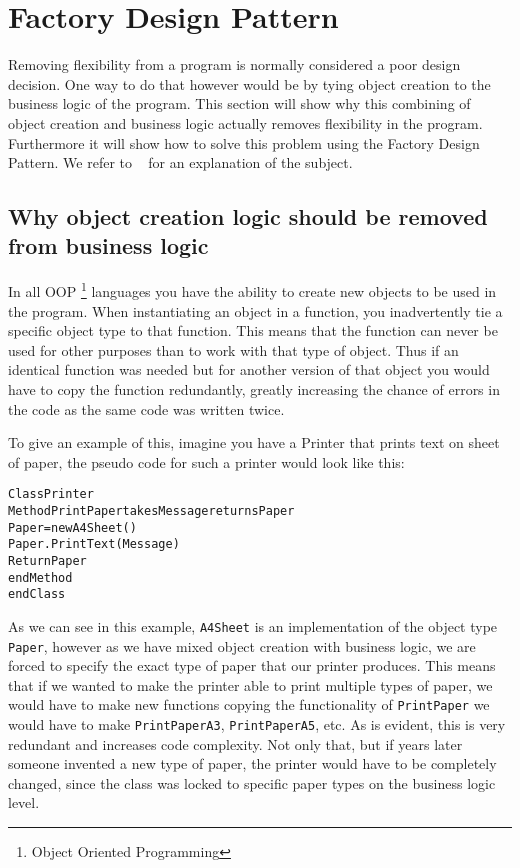 
\section{Factory Design Pattern\label{sec:TheoryFactoryDesignPattern}}

Removing flexibility from a program is normally considered a poor
design decision. One way to do that however would be by tying object
creation to the business logic of the program. This section will show
why this combining of object creation and business logic actually
removes flexibility in the program. Furthermore it will show how to
solve this problem using the Factory Design Pattern. We refer to ~\cite{WikiFactory}
for an explanation of the subject.


\subsection*{Why object creation logic should be removed from business logic}

In all OOP%
\footnote{Object Oriented Programming%
} languages you have the ability to create new objects to be used in
the program. When instantiating an object in a function, you inadvertently
tie a specific object type to that function. This means that the function
can never be used for other purposes than to work with that type of
object. Thus if an identical function was needed but for another version
of that object you would have to copy the function redundantly, greatly
increasing the chance of errors in the code as the same code was written
twice.

To give an example of this, imagine you have a Printer that prints
text on sheet of paper, the pseudo code for such a printer would look
like this:

\begin{alltt}
Class Printer 
    Method PrintPaper takes Message returns Paper
        Paper = new A4Sheet() 		
        Paper.PrintText(Message) 		
        Return Paper 	
    endMethod 
endClass
\end{alltt}

As we can see in this example, \texttt{A4Sheet} is an implementation
of the object type \texttt{Paper}, however as we have mixed object
creation with business logic, we are forced to specify the exact type
of paper that our printer produces. This means that if we wanted to
make the printer able to print multiple types of paper, we would have
to make new functions copying the functionality of \texttt{PrintPaper}
we would have to make \texttt{PrintPaperA3}, \texttt{PrintPaperA5},
etc. As is evident, this is very redundant and increases code complexity.
Not only that, but if years later someone invented a new type of paper,
the printer would have to be completely changed, since the class was
locked to specific paper types on the business logic level. 


